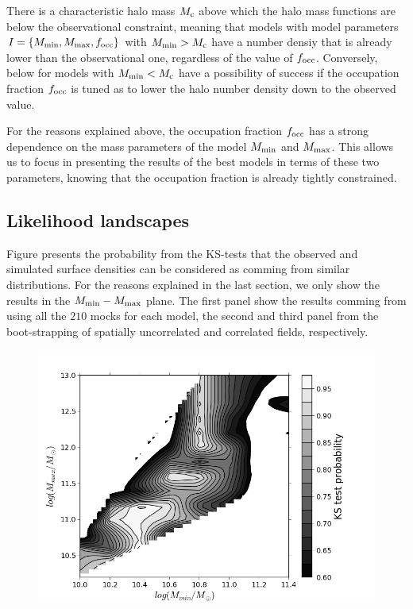 \documentclass{emulateapj}
\begin{document}
There is a characteristic halo mass $M_{\rm c}$ above which the halo mass functions are below the observational constraint, meaning that models with model parameters $I=\{M_{\rm min}, M_{\rm max}, f_{\rm occ}\}$ with $M_{\rm min}> M_{\rm c}$ have a number densiy that is already lower than the observational one, regardless of the value of $f_{\rm occ}$. Conversely, below for models with $M_{\rm min}<M_{\rm c}$ have a possibility of success if the occupation fraction $f_{\rm occ}$ is tuned as to lower the halo number density down to the observed value. 

For the reasons explained above, the occupation fraction $f_{\rm occ}$ has a strong dependence on the mass parameters of the model $M_{\rm min}$ and $M_{\rm max}$. This allows us to focus in presenting the results of the best models in terms of these two parameters, knowing that the occupation fraction is already tightly constrained.


\subsection{Likelihood landscapes}


Figure \label{figure:landscape} presents the probability from the KS-tests that the observed and simulated surface densities can be considered as comming from similar distributions. For the reasons explained in the last section, we only show the results in the $M_{\rm min}-M_{\rm max}$ plane. The first panel show the results comming from using all the $210$ mocks for each model, the second and third panel from the boot-strapping of spatially uncorrelated and correlated fields, respectively.

\begin{figure}
\begin{center}
\includegraphics[width=1.00\linewidth,angle=0]{./plots/probabillity_contour06-10bar.png}
\end{center} 
\caption{ \label{figure:landscape} 
}
\end{figure}
\end{document}
